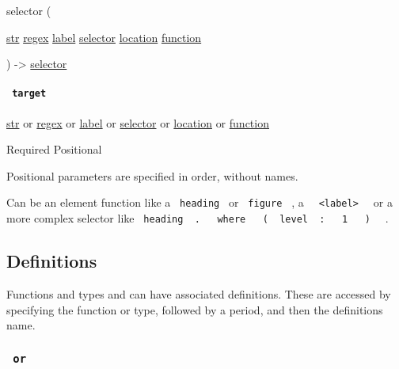 { selector } (

{ \href{/docs/reference/foundations/str/}{str}
\href{/docs/reference/foundations/regex/}{regex}
\href{/docs/reference/foundations/label/}{label}
\href{/docs/reference/foundations/selector/}{selector}
\href{/docs/reference/introspection/location/}{location}
\href{/docs/reference/foundations/function/}{function} }

) -\textgreater{} \href{/docs/reference/foundations/selector/}{selector}

\paragraph{\texorpdfstring{\texttt{\ target\ }}{ target }}\label{constructor-target}

\href{/docs/reference/foundations/str/}{str} {or}
\href{/docs/reference/foundations/regex/}{regex} {or}
\href{/docs/reference/foundations/label/}{label} {or}
\href{/docs/reference/foundations/selector/}{selector} {or}
\href{/docs/reference/introspection/location/}{location} {or}
\href{/docs/reference/foundations/function/}{function}

{Required} {{ Positional }}

\label{constructor-target-positional-tooltip}
Positional parameters are specified in order, without names.

Can be an element function like a \texttt{\ heading\ } or
\texttt{\ figure\ } , a
\texttt{\ }{\texttt{\ \textless{}label\textgreater{}\ }}\texttt{\ } or a
more complex selector like
\texttt{\ heading\ }{\texttt{\ .\ }}\texttt{\ }{\texttt{\ where\ }}\texttt{\ }{\texttt{\ (\ }}\texttt{\ level\ }{\texttt{\ :\ }}\texttt{\ }{\texttt{\ 1\ }}\texttt{\ }{\texttt{\ )\ }}\texttt{\ }
.

\subsection{\texorpdfstring{{ Definitions
}}{ Definitions }}\label{definitions}

\label{definitions-tooltip}
Functions and types and can have associated definitions. These are
accessed by specifying the function or type, followed by a period, and
then the definition\textquotesingle s name.

\subsubsection{\texorpdfstring{\texttt{\ or\ }}{ or }}\label{definitions-or}

